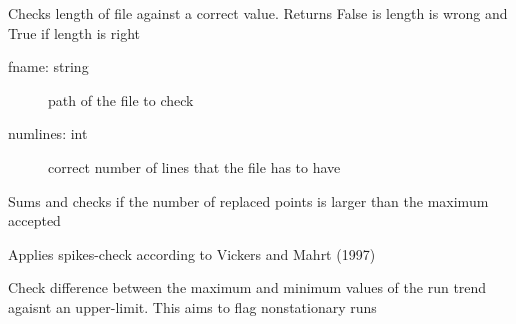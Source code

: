 \documentclass[a4paper,10pt,english]{sphinxmanual}
\begin{document}
\begin{fulllineitems}
\label{pymicra:pymicra.tests.check_numlines}
Checks length of file against a correct value.
Returns False is length is wrong and True if length is right
\begin{description}
\item[{fname: string}] \leavevmode
path of the file to check

\item[{numlines: int}] \leavevmode
correct number of lines that the file has to have

\end{description}

\end{fulllineitems}


\begin{fulllineitems}
\label{pymicra:pymicra.tests.check_replaced}
Sums and checks if the number of replaced points is larger than the
maximum accepted

\end{fulllineitems}


\begin{fulllineitems}
\label{pymicra:pymicra.tests.check_spikes}
Applies spikes-check according to Vickers and Mahrt (1997)

\end{fulllineitems}


\begin{fulllineitems}
\label{pymicra:pymicra.tests.check_stationarity}
Check difference between the maximum and minimum values of the run trend agaisnt an upper-limit.
This aims to flag nonstationary runs

\end{fulllineitems}
\end{document}
